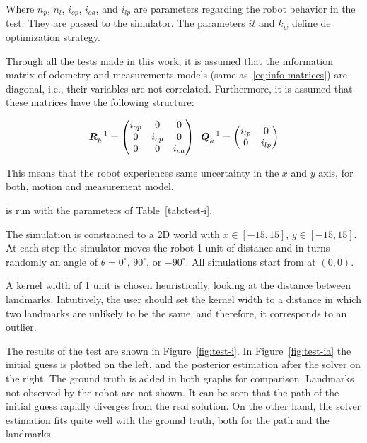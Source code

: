 Where $n_p$, $n_l$, $i_{op}$, $i_{oa}$, and $i_{lp}$ are parameters regarding the robot behavior in the test. They are passed to the simulator. The parameters $it$ and $k_w$ define de optimization strategy.

Through all the tests made in this work, it is assumed that the information matrix of odometry and measurements models (same as~\eqref{eq:info-matrices}) are diagonal, i.e., their variables are not correlated. Furthermore, it is assumed that these matrices have the following structure:

\begin{equation}
\boldsymbol{R}^{-1}_k = \begin{pmatrix}
i_{op} & 0 & 0\\
0 & i_{op} & 0\\
0 & 0 & i_{oa}
\end{pmatrix} \;\;
\boldsymbol{Q}^{-1}_k = \begin{pmatrix}
i_{lp} & 0\\
0 & i_{lp}
\end{pmatrix} 
\label{eq:info-matrices-tests}
\end{equation}

This means that the robot experiences same uncertainty in the $x$ and $y$ axis, for both, motion and measurement model. 

 is run with the parameters of Table~\ref{tab:test-i}. 

The simulation is constrained to a 2D world with $x\in[-15,15]$, $y\in[-15,15]$. At each step the simulator moves the robot 1 unit of distance and in turns randomly an angle of $\theta=0^\circ$, $90^\circ$, or $-90^\circ$. All simulations start from at $(0,0)$.

A kernel width of 1 unit is chosen heuristically, looking at the distance between landmarks. Intuitively, the user should set the kernel width to a distance in which two landmarks are unlikely to be the same, and therefore, it corresponds to an outlier.

The results of the test are shown in Figure~\ref{fig:test-i}. In Figure~\ref{fig:test-ia} the initial guess is plotted on the left, and the posterior estimation after the solver on the right. The ground truth is added in both graphs for comparison. Landmarks not observed by the robot are not shown.  It can be seen that the path of the initial guess rapidly diverges from the real solution. On the other hand, the solver estimation fits quite well with the ground truth, both for the path and the landmarks.

